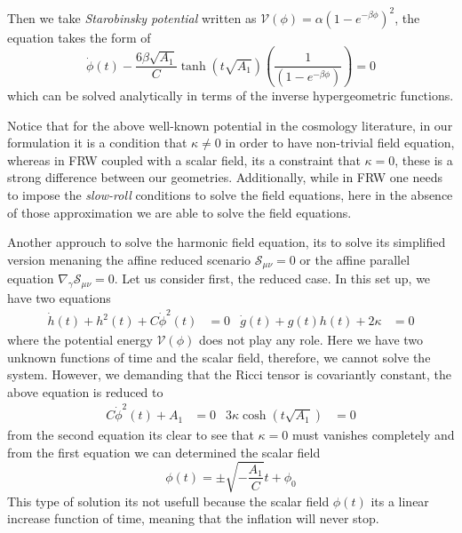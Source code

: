 \documentclass[10pt,a4paper]{article}
\begin{document}
Then we take \textit{Starobinsky potential} written as $\mathcal{V}(\phi) =  \alpha \left(1 - e^{-\beta\phi}\right)^2$, the equation takes
the form of
\begin{equation}
  \dot{\phi}(t) - \frac{6\beta\sqrt{A_1}}{C}\tanh\left(t\sqrt{A_1}\right)\left(\frac{1}{\left(1 - e^{-\beta\phi}\right)}\right) = 0
\end{equation}
which can be solved analytically in terms of the inverse hypergeometric functions.

Notice that for the above well-known potential in the cosmology literature, in our formulation it is a condition that $\kappa \neq 0$ in order
to have non-trivial field equation, whereas in FRW coupled with a scalar field, its a constraint that $\kappa = 0$, these is a strong difference
between our geometries. Additionally, while in FRW one needs to impose the \textit{slow-roll} conditions to solve the field equations, here
in the absence of those approximation we are able to solve the field equations.

Another approuch to solve the harmonic field equation, its to solve its simplified version menaning the affine reduced scenario $\mathcal{S}_{\mu\nu} = 0$
or the affine parallel equation $\nabla_\gamma\mathcal{S}_{\mu\nu} = 0$. Let us consider first, the reduced case. In this set up, we have two equations
\begin{align}
  \dot{h}(t) + h^2(t) + C\dot{\phi}^2(t) & = 0 & \dot{g}(t) + g(t)h(t) + 2\kappa & = 0
\end{align}
where the potential energy $\mathcal{V}(\phi)$ does not play any role. Here we have two unknown functions of time and the scalar field, therefore, we 
cannot solve the system. However, we demanding that the Ricci tensor is covariantly constant, the above equation is reduced to
\begin{align}
  C\dot{\phi}^2(t) + A_1 & = 0 & 3\kappa \cosh(t\sqrt{A_1}) & = 0
\end{align}
from the second equation its clear to see that $\kappa = 0$ must vanishes completely and from the first equation we can determined
the scalar field
\begin{equation}
  \phi(t) = \pm\sqrt{-\frac{A_1}{C}}t + \phi_0
\end{equation}
This type of solution its not usefull because the scalar field $\phi(t)$ its a linear increase function of time, meaning that the inflation
will never stop. 
\end{document}
